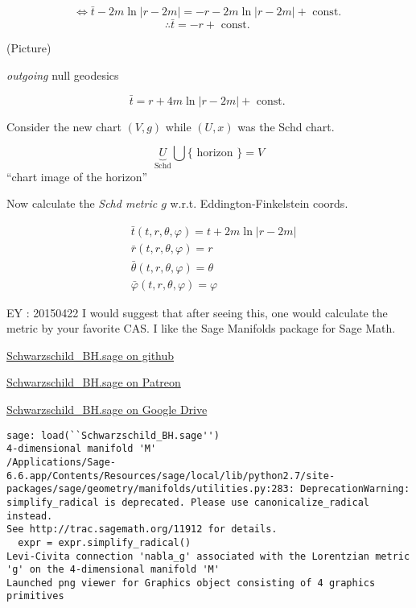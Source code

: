 \documentclass[10pt, twoside]{amsart}
\begin{document}
\begin{multicols*}{2}
\[
\Longleftrightarrow \bar{t} - 2m \ln{ |r-2m |} = -r - 2m \ln{ |r-2m |} + \text{ const. }
\]
\[
\therefore \bar{t} = -r + \text{ const. }
\]

(Picture)

\emph{outgoing} null geodesics

\[
\bar{t} = r + 4 m \ln{ |r - 2m| } + \text{ const. }
\]

Consider the new chart $(V,g)$ while $(U,x)$ was the Schd chart.

\[
\underbrace{U}_{\text{Schd}} \bigcup \lbrace \text{ horizon } \rbrace = V
\]
``chart image of the horizon''

Now calculate the \emph{Schd metric $g$ } w.r.t. Eddington-Finkelstein coords.

\[
\begin{aligned}
  & \bar{t}(t,r,\theta,\varphi) = t + 2m\ln{ |r -2m | } \\
  & \bar{r}(t,r,\theta,\varphi) = r \\
  & \bar{\theta}(t,r,\theta,\varphi) = \theta \\
  & \bar{\varphi}(t,r,\theta,\varphi) = \varphi
\end{aligned}
\]

EY : 20150422 I would suggest that after seeing this, one would calculate the metric by your favorite CAS.  I like the Sage Manifolds package for Sage Math.  

\href{https://github.com/ernestyalumni/diffgeo-by-sagemnfd/blob/master/Schwarzschild_BH.sage}{Schwarzschild\_BH.sage on github}

\href{https://www.patreon.com/file?s=645287&h=2254352&i=108637}{Schwarzschild\_BH.sage on Patreon}

\href{https://drive.google.com/file/d/0B1H1Ygkr4EWJdllTR3czQU9DeW8/view?usp=sharing}{Schwarzschild\_BH.sage on Google Drive}

\begin{lstlisting}[frame=single]
sage: load(``Schwarzschild_BH.sage'')
4-dimensional manifold 'M'
/Applications/Sage-6.6.app/Contents/Resources/sage/local/lib/python2.7/site-packages/sage/geometry/manifolds/utilities.py:283: DeprecationWarning: simplify_radical is deprecated. Please use canonicalize_radical instead.
See http://trac.sagemath.org/11912 for details.
  expr = expr.simplify_radical()
Levi-Civita connection 'nabla_g' associated with the Lorentzian metric 'g' on the 4-dimensional manifold 'M'
Launched png viewer for Graphics object consisting of 4 graphics primitives
\end{lstlisting}


\end{multicols*}
\end{document}
